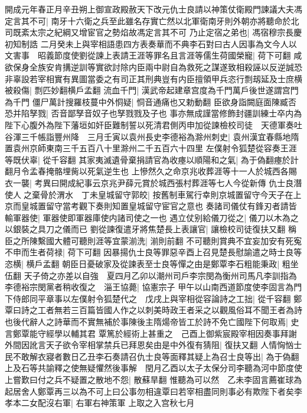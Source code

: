 開成元年春正月辛丑朔上御宣政殿赦天下改元仇士良請以神策仗衛殿門諫議大夫馮定言其不可|{
	南牙十六衛之兵至此雖名存實亡然以北軍衛南牙則外朝亦將聽命於北司既紊太宗之紀綱又增宦官之勢焰故馮定言其不可}
乃止定宿之弟也|{
	馮宿穆宗長慶初知制誥}
二月癸未上與宰相語患四方表奏華而不典李石對曰古人因事為文今人以文害事　昭義節度使劉從諫上表請王涯等罪名且言涯等儒生荷國榮寵|{
	荷下可翻}
咸欲保身全族安肯搆逆訓等實欲討除内臣兩中尉自為救死之謀遂致相殺誣以反逆誠恐非辜設若宰相實有異圖當委之有司正其刑典豈有内臣擅領甲兵恣行剽刼延及士庶横被殺傷|{
	剽匹妙翻横戶孟翻}
流血千門|{
	漢武帝起建章宫度為千門萬戶後世遂謂宫門為千門}
僵尸萬計搜羅枝蔓中外恫疑|{
	恫音通痛也又勅動翻}
臣欲身詣闕庭面陳臧否恐并陷孥戮|{
	否音鄙孥音奴子也孥戮戮及子也}
事亦無成謹當修飾封疆訓練士卒内為陛下心腹外為陛下藩垣如奸臣難制誓以死清君側丙申加從諫檢校司徒　天德軍奏吐谷渾三千帳詣豐州降　三月壬寅以袁州長史李德裕為滁州刺史|{
	袁州漢宜春縣地隋置袁州京師東南三千五百八十里滁州二千五百六十四里}
左僕射令狐楚從容奏王涯等既伏辜|{
	從千容翻}
其家夷滅遺骨棄捐請官為收瘞以順陽和之氣|{
	為于偽翻瘞於計翻月令孟春掩骼埋胔以死氣逆生也}
上慘然久之命京兆收葬涯等十一人於城西各賜衣一襲|{
	考異曰開成紀事云京兆尹薛元賞於城西張村葬涯等七人今從新傳}
仇士良潛使人之棄骨於渭水　丁未皇城留守郭皎|{
	按舊制車駕行幸則京城置留守今天子在上京而皇城置留守當考觀下奏則知置皇城留守宦官之意也}
奏諸司儀仗有鋒刃者請皆輸軍器使|{
	軍器使即軍器庫使内諸司使之一也}
遇立仗别給儀刀從之|{
	儀刀以木為之以銀裝之具刀之儀而已}
劉從諫復遣牙將焦楚長上表讓官|{
	讓檢校司徒復扶又翻}
稱臣之所陳繫國大體可聽則涯等宜蒙湔洗|{
	湔則前翻}
不可聽則賞典不宜妄加安有死寃不申而生者荷禄|{
	荷下可翻}
因暴揚仇士良等罪惡辛酉上召見楚長慰諭遣之時士良等恣横|{
	横戶孟翻}
朝臣日憂破家及從諫表至士良等憚之由是鄭覃李石粗能秉政|{
	粗坐伍翻}
天子倚之亦差以自強　夏四月乙卯以潮州司戶李宗閔為衡州司馬凡李訓指為李德裕宗閔黨者稍收復之　淄王協薨|{
	協憲宗子}
甲午以山南西道節度使李固言為門下侍郎同平章事以左僕射令狐楚代之　戊戌上與宰相從容論詩之工拙|{
	從千容翻}
鄭覃曰詩之工者無若三百篇皆國人作之以刺美時政王者采之以觀風俗耳不聞王者為詩也後代辭人之詩華而不實無補於事陳後主隋煬帝皆工於詩不免亡國陛下何取焉|{
	史言鄭覃能守經學以輔其君}
覃篤於經術上甚重之　己酉上御紫宸殿宰相因奏事拜謝外間因訛言天子欲令宰相掌禁兵已拜恩矣由是中外復有猜阻|{
	復扶又翻}
人情恟忷士民不敢解衣寢者數日乙丑李石奏請召仇士良等面釋其疑上為召士良等出|{
	為于偽翻}
上及石等共諭釋之使無疑懼然後事解　閏月乙酉以太子太保分司李聽為河中節度使上嘗歎曰付之兵不疑置之散地不怨|{
	散蘇旱翻}
惟聽為可以然　乙未李固言薦崔球為起居舍人鄭覃再三以為不可上曰公事勿相違覃曰若宰相盡同則事必有欺陛下者矣李孝本二女配沒右軍|{
	右軍右神策軍}
上取之入宫秋七月

